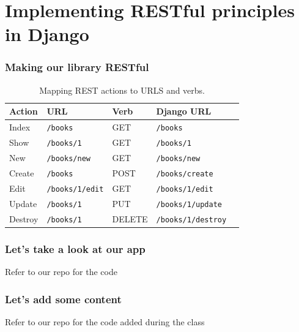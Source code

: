 \documentclass[10pt,t,xcolor=dvipsnames]{beamer}
\begin{document}
\section{Implementing RESTful principles in Django}
\begin{frame}[fragile]
\frametitle{Making our library RESTful}
\pause
\begin{table}
\scriptsize
\centering
\begin{tabular}{|l|l|l|l|l|}\hline
\textbf{Action}  &\textbf{URL}&  \textbf{Verb} & \textbf{Django URL} \\ \hline\hline
Index&    \texttt{/books}&         GET &     \texttt{/books}\\
Show&     \texttt{/books/1}&       GET &     \texttt{/books/1}\\
New&      \texttt{/books/new}&     GET &     \texttt{/books/new}\\
Create&   \texttt{/books}&         POST &    \texttt{/books/create} \\
Edit&     \texttt{/books/1/edit}&  GET &     \texttt{/books/1/edit}\\
Update&   \texttt{/books/1}&       PUT &     \texttt{/books/1/update}\\
Destroy&  \texttt{/books/1}&       DELETE &  \texttt{/books/1/destroy}\\ \hline
\end{tabular}
\caption{\footnotesize Mapping REST actions to URLS and verbs.}
\end{table}

\end{frame}
\begin{frame}[fragile]
\frametitle{Let's take a look at our app}
Refer to our repo for the code
\end{frame}
\begin{frame}[fragile]
\frametitle{Let's add some content}
Refer to our repo for the code added during the class
\end{frame}

\end{document}
